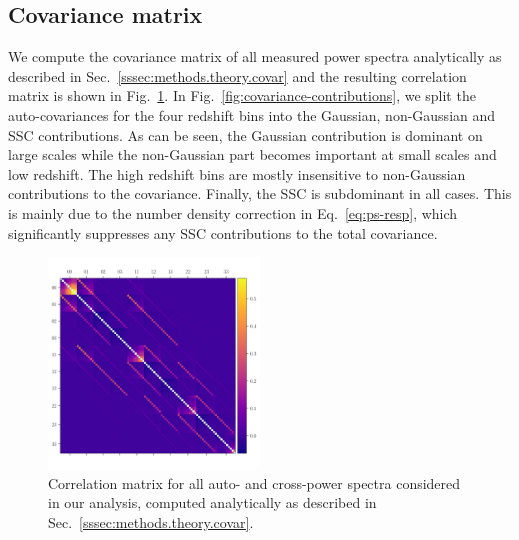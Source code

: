 \documentclass[a4paper,11pt]{article}
\begin{document}
  \subsection{Covariance matrix}\label{ssec:results.covariance}
    We compute the covariance matrix of all measured power spectra analytically as described in Sec.~\ref{sssec:methods.theory.covar} and the resulting correlation matrix is shown in Fig.~\ref{fig:covmat}. In Fig.~\ref{fig:covariance-contributions}, we split the auto-covariances for the four redshift bins into the Gaussian, non-Gaussian and SSC contributions. As can be seen, the Gaussian contribution is dominant on large scales while the non-Gaussian part becomes important at small scales and low redshift. The high redshift bins are mostly insensitive to non-Gaussian contributions to the covariance. Finally, the SSC is subdominant in all cases. This is mainly due to the number density correction in Eq.~\ref{eq:ps-resp}, which significantly suppresses any SSC contributions to the total covariance.
    \begin{figure}
      \begin{center}
        \includegraphics[width=0.5\textwidth]{figures/covmat_HSC_dg_hoddg_hodxdg_hoddg_hod_trisp=4h3h2h_SSC=LINBIAS-resp_l=ells_eff_all_wcross_clfit=HOD-zevol_culled=True_coadd=area_G+NG+SSC.pdf}
        \caption{Correlation matrix for all auto- and cross-power spectra considered in our analysis, computed analytically as described in Sec.~\ref{sssec:methods.theory.covar}.}\label{fig:covmat}
      \end{center}
    \end{figure}
\end{document}
